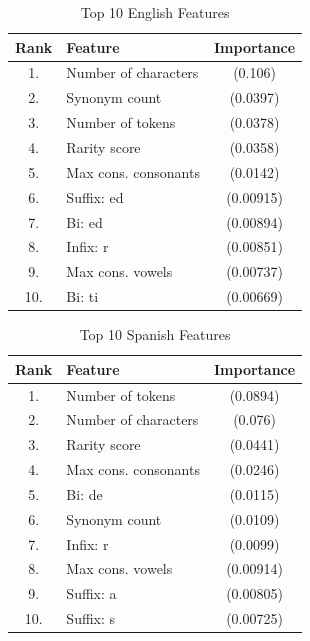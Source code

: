 \documentclass[11pt,a4paper]{article}
\begin{document}
\begin{table}[h]
\begin{center}
\begin{tabular}{|c|l|c|}
\hline
\textbf{Rank} & \textbf{Feature} & \textbf{Importance} \\
\hline
1. & Number of characters & (0.106) \\ \hline
2. & Synonym count & (0.0397) \\ \hline
3. & Number of tokens & (0.0378) \\ \hline
4. & Rarity score & (0.0358) \\ \hline
5. & Max cons. consonants & (0.0142) \\ \hline
6. & Suffix: ed & (0.00915) \\ \hline
7. & Bi: ed & (0.00894) \\ \hline
8. & Infix: r & (0.00851) \\ \hline
9. & Max cons. vowels & (0.00737) \\ \hline
10. & Bi: ti & (0.00669) \\ \hline
\end{tabular}
\caption{Top 10 English Features}
\label{tab:EngFeats}
\end{center}
\end{table}

\begin{table}[h]
\begin{center}
\begin{tabular}{|c|l|c|}
\hline
\textbf{Rank} & \textbf{Feature} & \textbf{Importance} \\
\hline
1. & Number of tokens & (0.0894) \\ \hline
2. & Number of characters & (0.076) \\ \hline
3. & Rarity score & (0.0441) \\ \hline
4. & Max cons. consonants & (0.0246) \\ \hline
5. & Bi: de & (0.0115) \\ \hline
6. & Synonym count & (0.0109) \\ \hline
7. & Infix: r & (0.0099) \\ \hline
8. & Max cons. vowels & (0.00914) \\ \hline
9. & Suffix: a & (0.00805) \\ \hline
10. & Suffix: s & (0.00725) \\ \hline
\end{tabular}
\caption{Top 10 Spanish Features}
\label{tab:SpFeats}
\end{center}
\end{table}
\end{document}
